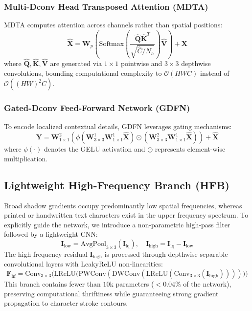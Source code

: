 \documentclass[conference]{IEEEtran}
\begin{document}
\subsubsection{Multi-Dconv Head Transposed Attention (MDTA)}
MDTA computes attention across channels rather than spatial positions:
\begin{equation}
\mathbf{\hat{X}} = \mathbf{W}_p \left( \text{Softmax}\left(\frac{\mathbf{\hat{Q}} \mathbf{\hat{K}}^T}{\sqrt{\hat{C}/N_h}}\right) \mathbf{\hat{V}} \right) + \mathbf{X}
\end{equation}
where $\mathbf{\hat{Q}}, \mathbf{\hat{K}}, \mathbf{\hat{V}}$ are generated via $1 \times 1$ pointwise and $3 \times 3$ depthwise convolutions, bounding computational complexity to $\mathcal{O}(H W C)$ instead of $\mathcal{O}((HW)^2 C)$.

\subsubsection{Gated-Dconv Feed-Forward Network (GDFN)}
To encode localized contextual details, GDFN leverages gating mechanisms:
\begin{equation}
\mathbf{Y} = \mathbf{W}_{1\times 1}^2 \left( \phi(\mathbf{W}_{3\times 3}^1 \mathbf{W}_{1\times 1}^1 \mathbf{\hat{X}}) \odot (\mathbf{W}_{3\times 3}^2 \mathbf{W}_{1\times 1}^1 \mathbf{\hat{X}}) \right) + \mathbf{\hat{X}}
\end{equation}
where $\phi(\cdot)$ denotes the GELU activation and $\odot$ represents element-wise multiplication.

\subsection{Lightweight High-Frequency Branch (HFB)}
Broad shadow gradients occupy predominantly low spatial frequencies, whereas printed or handwritten text characters exist in the upper frequency spectrum. To explicitly guide the network, we introduce a non-parametric high-pass filter followed by a lightweight CNN:
\begin{equation}
\mathbf{I}_{\text{low}} = \text{AvgPool}_{3\times 3}(\mathbf{I}_{\text{lq}}), \quad \mathbf{I}_{\text{high}} = \mathbf{I}_{\text{lq}} - \mathbf{I}_{\text{low}}
\end{equation}
The high-frequency residual $\mathbf{I}_{\text{high}}$ is processed through depthwise-separable convolutional layers with LeakyReLU non-linearities:
\begin{equation}
\mathbf{F}_{\text{hf}} = \text{Conv}_{3\times 3}\Big(\text{LReLU}\big(\text{PWConv}(\text{DWConv}(\text{LReLU}(\text{Conv}_{3\times 3}(\mathbf{I}_{\text{high}}))))\big)\Big)
\end{equation}
This branch contains fewer than $10\text{k}$ parameters ($<0.04\%$ of the network), preserving computational thriftiness while guaranteeing strong gradient propagation to character stroke contours.
\end{document}
